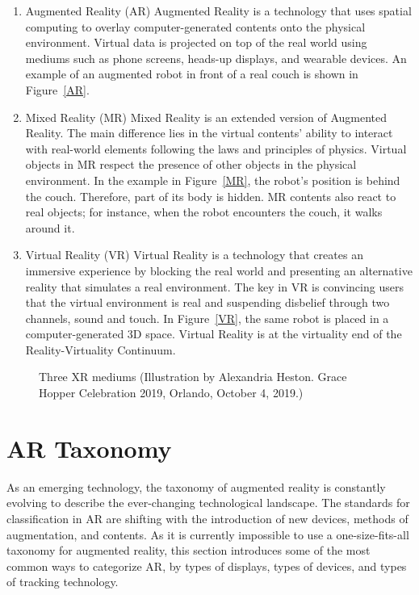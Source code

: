 \begin{enumerate}
	\item Augmented Reality (AR)
	\newline
	Augmented Reality is a technology that uses spatial computing to overlay computer-generated contents onto the physical environment. Virtual data is projected on top of the real world using mediums such as phone screens, heads-up displays, and wearable devices. An example of an augmented robot in front of a real couch is shown in Figure~\ref{AR}.
	\item Mixed Reality (MR)
	\newline
	Mixed Reality is an extended version of Augmented Reality. The main difference lies in the virtual contents' ability to interact with real-world elements following the laws and principles of physics. Virtual objects in MR respect the presence of other objects in the physical environment. In the example in Figure~\ref{MR}, the robot's position is behind the couch. Therefore, part of its body is hidden. MR contents also react to real objects; for instance, when the robot encounters the couch, it walks around it.
	\item Virtual Reality (VR)
	\newline
	Virtual Reality is a technology that creates an immersive experience by blocking the real world and presenting an alternative reality that simulates a real environment. The key in VR is convincing users that the virtual environment is real and suspending disbelief through two channels, sound and touch. In Figure~\ref{VR}, the same robot is placed in a computer-generated 3D space. Virtual Reality is at the virtuality end of the Reality-Virtuality Continuum.
\end{enumerate}

\begin{figure}[!ht]\centering
{}
\qquad
{}
\qquad
{}
\caption{Three XR mediums (Illustration by Alexandria Heston. Grace Hopper Celebration 2019, Orlando, October 4, 2019.)}\label{fig3}
\end{figure}
\vspace{-.1 in}

\section{AR Taxonomy}
As an emerging technology, the taxonomy of augmented reality is constantly evolving to describe the ever-changing technological landscape. The standards for classification in AR are shifting with the introduction of new devices, methods of augmentation, and contents. As it is currently impossible to use a one-size-fits-all taxonomy for augmented reality, this section introduces some of the most common ways to categorize AR, by types of displays, types of devices, and types of tracking technology.

